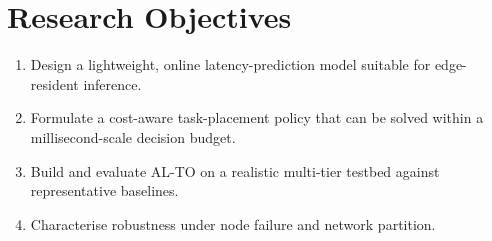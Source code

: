 \section{Research Objectives}
\begin{enumerate}[label=\textbf{O\arabic*.},leftmargin=2.2em]
  \item Design a lightweight, online latency-prediction model suitable for edge-resident inference.
  \item Formulate a cost-aware task-placement policy that can be solved within a millisecond-scale decision budget.
  \item Build and evaluate AL-TO on a realistic multi-tier testbed against representative baselines.
  \item Characterise robustness under node failure and network partition.
\end{enumerate}
